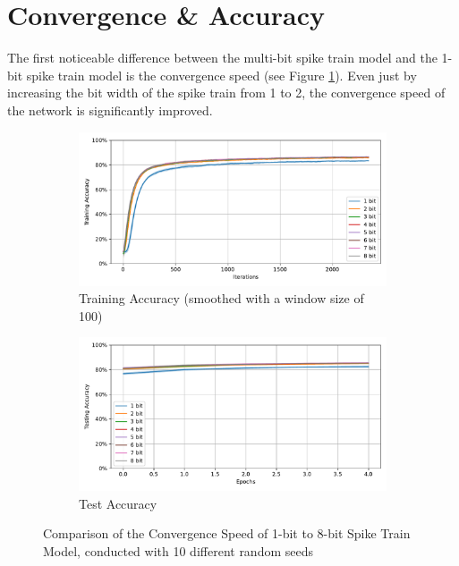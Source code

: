 \section{Convergence \& Accuracy}
\label{sec:convergence_accuracy}
    The first noticeable difference between the multi-bit spike train model and the 1-bit spike train model is the convergence speed (see Figure \ref{fig:convergence_speed}). Even just by increasing the bit width of the spike train from 1 to 2, the convergence speed of the network is significantly improved. 
    \begin{figure}[!htpb]
        \centering
        \begin{subfigure}[H]{\textwidth}
            \centering
            \includegraphics[width=\textwidth]{../standard/FashionMNIST/plots/fashionmnist_train_acc.pdf}
            \caption{Training Accuracy (smoothed with a window size of 100)}
        \end{subfigure}
        \hfill
        \begin{subfigure}[H]{\textwidth}
            \centering
            \includegraphics[width=\textwidth]{../standard/FashionMNIST/plots/fashionmnist_test_acc.pdf}
            \caption{Test Accuracy}
        \end{subfigure}
        \caption{Comparison of the Convergence Speed of 1-bit to 8-bit Spike Train Model, conducted with 10 different random seeds}
        \label{fig:convergence_speed}
    \end{figure}


